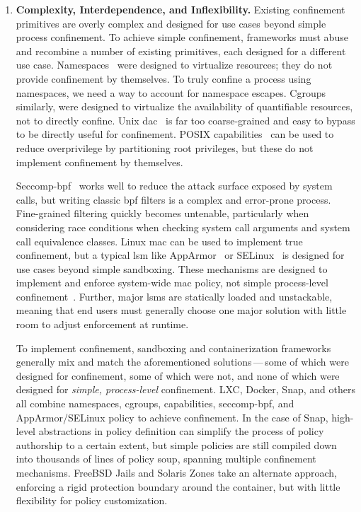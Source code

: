 \documentclass[
  fontsize=12pt,
  titlepage=firstiscover,
  paper=letter,
oneside,
  cleardoublepage=plain,
  parskip=half-,
  DIV=10,
  parindent,
  appendixprefix,
  chapterprefix,
  listof=totoc,
]{scrbook}
\begin{document}
\begin{enumerate}[font=\bfseries]
  \item \label{i:problem-complexity} \textbf{Complexity, Interdependence, and Inflexibility.}
    Existing confinement primitives are overly complex and designed for use cases beyond
    simple process confinement. To achieve simple confinement, frameworks must abuse and
    recombine a number of existing primitives, each designed for a different use case.
    Namespaces~\cite{biederman2006_namespaces, linux_namespaces} were designed to
    virtualize resources; they do not provide confinement by themselves. To truly confine
    a process using namespaces, we need a way to account for namespace escapes.
    Cgroups~\cite{cgroups} similarly, were designed to virtualize the availability of
    quantifiable resources, not to directly confine. Unix
    \gls{dac}~\cite{jaeger2008_os_security, van_oorschot2020_tools_jewels} is far too
    coarse-grained and easy to bypass to be directly useful for confinement. POSIX
    capabilities~\cite{posix_capabilities} can be used to reduce overprivilege by
    partitioning root privileges, but these do not implement confinement by themselves.

    Seccomp-bpf~\cite{seccomp, edge2015_seccomp} works well to reduce the attack surface
    exposed by system calls, but writing classic \gls{bpf} filters is a complex and
    error-prone process. Fine-grained filtering quickly becomes untenable, particularly
    when considering race conditions when checking system call arguments and system call
    equivalence classes.  Linux \gls{mac} can be used to implement true confinement, but
    a typical \gls{lsm} like AppArmor~\cite{cowan2000_apparmor} or
    SELinux~\cite{smalley2001_selinux} is designed for use cases beyond simple sandboxing.
    These mechanisms are designed to implement and enforce system-wide \gls{mac} policy,
    not simple process-level confinement~\cite{belair2019_leveraging}. Further, major
    \glspl{lsm} are statically loaded and unstackable, meaning that end users must
    generally choose one major solution with little room to adjust enforcement at runtime.

    To implement confinement, sandboxing and containerization frameworks generally mix and
    match the aforementioned solutions\,---\,some of which were designed for confinement,
    some of which were not, and none of which were designed for \textit{simple,
    process-level} confinement. LXC, Docker, Snap, and others all combine namespaces,
    cgroups, capabilities, seccomp-bpf, and AppArmor/SELinux policy to achieve
    confinement. In the case of Snap, high-level abstractions in policy definition can
    simplify the process of policy authorship to a certain extent, but simple policies
    are still compiled down into thousands of lines of policy soup, spanning multiple
    confinement mechanisms. FreeBSD Jails and Solaris Zones take an alternate approach,
    enforcing a rigid protection boundary around the container, but with little flexibility
    for policy customization.


\end{enumerate}
\end{document}
